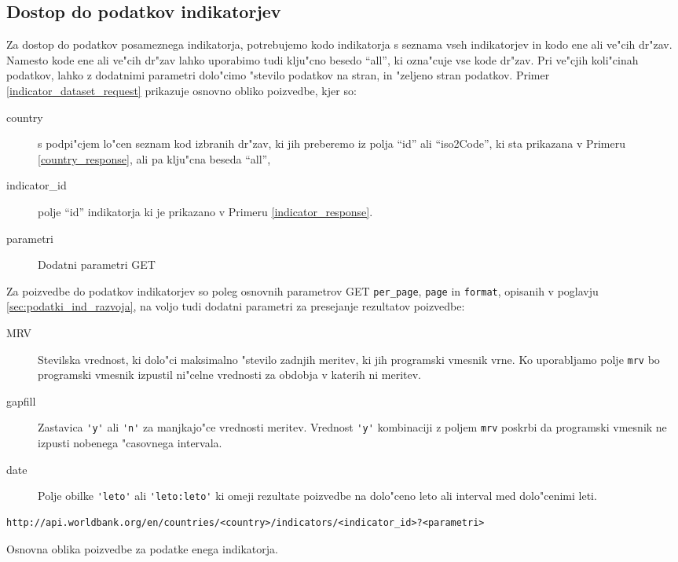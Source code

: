 \subsection{Dostop do podatkov indikatorjev}

Za dostop do podatkov posameznega indikatorja, potrebujemo kodo
indikatorja s seznama vseh indikatorjev in kodo ene ali ve"cih dr"zav. Namesto
kode ene ali ve"cih dr"zav lahko uporabimo tudi klju"cno besedo ``all'', ki
ozna"cuje vse kode dr"zav. Pri ve"cjih koli"cinah podatkov, lahko z dodatnimi
parametri dolo"cimo "stevilo podatkov na stran, in "zeljeno stran podatkov.
Primer \ref{indicator_dataset_request} prikazuje osnovno obliko poizvedbe,
kjer so:
\begin{description}
\item [country] s podpi"cjem lo"cen seznam kod izbranih dr"zav, ki jih 
	  preberemo iz polja ``id'' ali ``iso2Code'', ki sta prikazana v Primeru 
    \ref{country_response}, ali pa klju"cna beseda ``all'',
\item [indicator\_id] polje ``id'' indikatorja ki je prikazano v Primeru 
    \ref{indicator_response}.
\item [parametri] Dodatni parametri GET 
\end{description}
Za poizvedbe do podatkov indikatorjev so poleg osnovnih parametrov GET 
\verb|per_page|, \verb|page| in \verb|format|, opisanih v poglavju 
\ref{sec:podatki_ind_razvoja}, na voljo tudi dodatni parametri za presejanje
rezultatov poizvedbe:
\begin{description}  
\item [MRV] Stevilska vrednost, ki dolo"ci maksimalno "stevilo zadnjih meritev,
    ki jih programski vmesnik vrne. Ko uporabljamo polje \verb|mrv| bo 
    programski vmesnik izpustil ni"celne vrednosti za obdobja v katerih ni
    meritev.
\item [gapfill] Zastavica \verb|'y'| ali \verb|'n'| za manjkajo"ce vrednosti meritev.
    Vrednost \verb|'y'| kombinaciji z poljem \verb|mrv| poskrbi da programski 
    vmesnik ne izpusti nobenega "casovnega intervala.
\item [date] Polje obilke \verb|'leto'| ali \verb|'leto:leto'| ki omeji rezultate poizvedbe
    na dolo"ceno leto ali interval med dolo"cenimi leti. 
\end{description}


\begin{snippet}
\begin{center}
\begin{lstlisting}
http://api.worldbank.org/en/countries/<country>/indicators/<indicator_id>?<parametri>
\end{lstlisting}
\end{center}
\caption{Osnovna oblika poizvedbe za podatke enega indikatorja.}
\label{indicator_dataset_request}
\end{snippet} 

